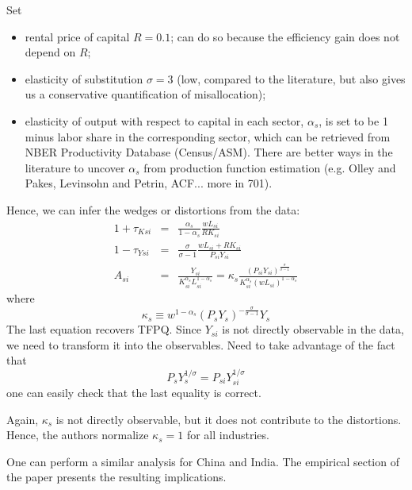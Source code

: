 \documentclass[12pt]{article}
\begin{document}
	Set
	\begin{itemize}
		\item rental price of capital $R = 0.1$; can do so because the efficiency gain does not depend on $R$;
		\item elasticity of substitution $\sigma = 3$ (low, compared to the literature, but also gives us a conservative quantification of misallocation);
		\item elasticity of output with respect to capital in each sector, $\alpha_s$, is set to be 1 minus labor share in the corresponding sector, which can be retrieved from NBER Productivity Database (Census/ASM). There are better ways in the literature to uncover $\alpha_s$ from production function estimation (e.g. Olley and Pakes, Levinsohn and Petrin, ACF... more in 701).
	\end{itemize}
		Hence, we can infer the wedges or distortions from the data:
	\begin{eqnarray}
		1+\tau_{Ksi} &=& \frac{\alpha_s}{1-\alpha_s} \frac{wL_{si}}{RK_{si}} \\
		1-\tau_{Ysi} &=& \frac{\sigma}{\sigma -1} \frac{wL_{si} + RK_{si}}{P_{si}Y_{si}} \\
		A_{si} &=& \frac{Y_{si}}{K_{si}^{\alpha_s} L_{si}^{1-\alpha_s}} = \kappa_s \frac{(P_{si}Y_{si})^{\frac{\sigma}{\sigma -1}}}{K_{si}^{\alpha_s} (wL_{si})^{1-\alpha_s}}
	\end{eqnarray}
	where 
	\[\kappa_s \equiv w^{1-\alpha_s} (P_sY_s)^{-\frac{\sigma}{\sigma-1}} Y_s\]
	The last equation recovers TFPQ. Since $Y_{si}$ is not directly observable in the data, we need to transform it into the observables. Need to take advantage of the fact that
	\[P_s Y_s^{1/\sigma} = P_{si} Y_{si}^{1/\sigma}\]
	one can easily check that the last equality is correct.
	
	Again, $\kappa_s$ is not directly observable, but it does not contribute to the distortions. Hence, the authors normalize $\kappa_s = 1$ for all industries. 
	
		One can perform a similar analysis for China and India. The empirical section of the paper presents the resulting implications.
	
\end{document}
